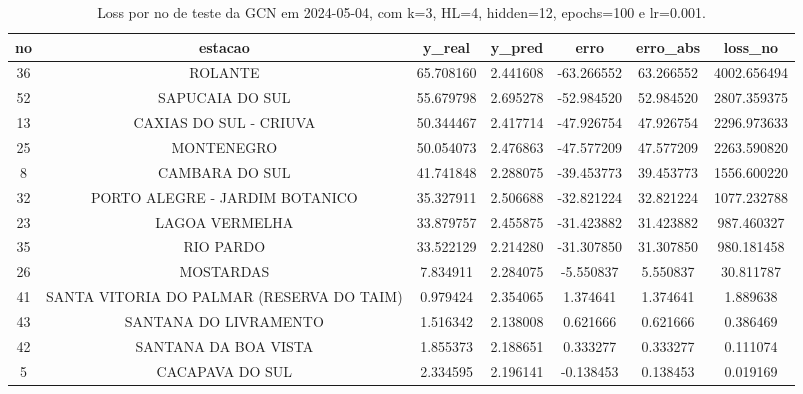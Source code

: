 \begin{table}[h]
\centering
\caption{Loss por no de teste da GCN em 2024-05-04, com k=3, HL=4, hidden=12, epochs=100 e lr=0.001.}
\label{tab:gcn_loss_k3_hl4_h12_e100_d20240504}
\begin{tabular}{ccccccc}
\toprule
no & estacao & y\_real & y\_pred & erro & erro\_abs & loss\_no \\
\midrule
36 & ROLANTE & 65.708160 & 2.441608 & -63.266552 & 63.266552 & 4002.656494 \\
52 & SAPUCAIA DO SUL & 55.679798 & 2.695278 & -52.984520 & 52.984520 & 2807.359375 \\
13 & CAXIAS DO SUL - CRIUVA & 50.344467 & 2.417714 & -47.926754 & 47.926754 & 2296.973633 \\
25 & MONTENEGRO & 50.054073 & 2.476863 & -47.577209 & 47.577209 & 2263.590820 \\
8 & CAMBARA DO SUL & 41.741848 & 2.288075 & -39.453773 & 39.453773 & 1556.600220 \\
32 & PORTO ALEGRE - JARDIM BOTANICO & 35.327911 & 2.506688 & -32.821224 & 32.821224 & 1077.232788 \\
23 & LAGOA VERMELHA & 33.879757 & 2.455875 & -31.423882 & 31.423882 & 987.460327 \\
35 & RIO PARDO & 33.522129 & 2.214280 & -31.307850 & 31.307850 & 980.181458 \\
26 & MOSTARDAS & 7.834911 & 2.284075 & -5.550837 & 5.550837 & 30.811787 \\
41 & SANTA VITORIA DO PALMAR (RESERVA DO TAIM) & 0.979424 & 2.354065 & 1.374641 & 1.374641 & 1.889638 \\
43 & SANTANA DO LIVRAMENTO & 1.516342 & 2.138008 & 0.621666 & 0.621666 & 0.386469 \\
42 & SANTANA DA BOA VISTA & 1.855373 & 2.188651 & 0.333277 & 0.333277 & 0.111074 \\
5 & CACAPAVA DO SUL & 2.334595 & 2.196141 & -0.138453 & 0.138453 & 0.019169 \\
\bottomrule
\end{tabular}
\end{table}
